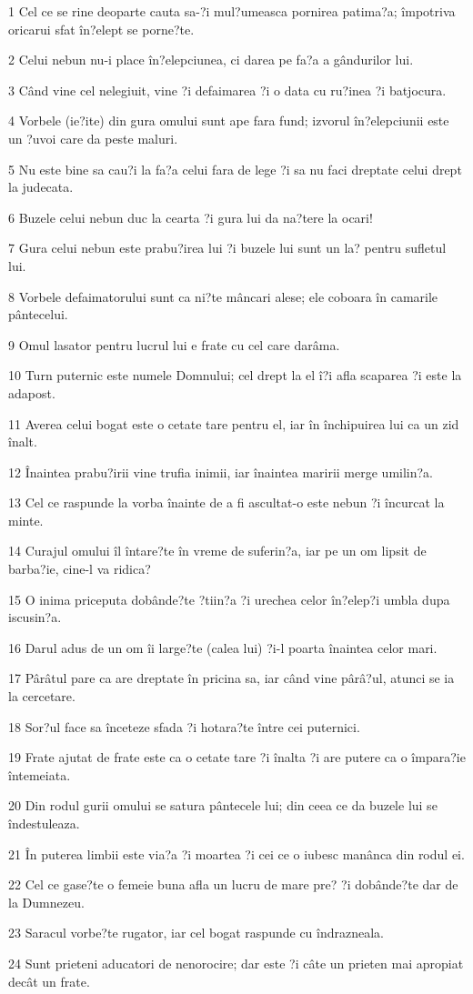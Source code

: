 \par 1 Cel ce se rine deoparte cauta sa-?i mul?umeasca pornirea patima?a; împotriva oricarui sfat în?elept se porne?te.
\par 2 Celui nebun nu-i place în?elepciunea, ci darea pe fa?a a gândurilor lui.
\par 3 Când vine cel nelegiuit, vine ?i defaimarea ?i o data cu ru?inea ?i batjocura.
\par 4 Vorbele (ie?ite) din gura omului sunt ape fara fund; izvorul în?elepciunii este un ?uvoi care da peste maluri.
\par 5 Nu este bine sa cau?i la fa?a celui fara de lege ?i sa nu faci dreptate celui drept la judecata.
\par 6 Buzele celui nebun duc la cearta ?i gura lui da na?tere la ocari!
\par 7 Gura celui nebun este prabu?irea lui ?i buzele lui sunt un la? pentru sufletul lui.
\par 8 Vorbele defaimatorului sunt ca ni?te mâncari alese; ele coboara în camarile pântecelui.
\par 9 Omul lasator pentru lucrul lui e frate cu cel care darâma.
\par 10 Turn puternic este numele Domnului; cel drept la el î?i afla scaparea ?i este la adapost.
\par 11 Averea celui bogat este o cetate tare pentru el, iar în închipuirea lui ca un zid înalt.
\par 12 Înaintea prabu?irii vine trufia inimii, iar înaintea maririi merge umilin?a.
\par 13 Cel ce raspunde la vorba înainte de a fi ascultat-o este nebun ?i încurcat la minte.
\par 14 Curajul omului îl întare?te în vreme de suferin?a, iar pe un om lipsit de barba?ie, cine-l va ridica?
\par 15 O inima priceputa dobânde?te ?tiin?a ?i urechea celor în?elep?i umbla dupa iscusin?a.
\par 16 Darul adus de un om îi large?te (calea lui) ?i-l poarta înaintea celor mari.
\par 17 Pârâtul pare ca are dreptate în pricina sa, iar când vine pârâ?ul, atunci se ia la cercetare.
\par 18 Sor?ul face sa înceteze sfada ?i hotara?te între cei puternici.
\par 19 Frate ajutat de frate este ca o cetate tare ?i înalta ?i are putere ca o împara?ie întemeiata.
\par 20 Din rodul gurii omului se satura pântecele lui; din ceea ce da buzele lui se îndestuleaza.
\par 21 În puterea limbii este via?a ?i moartea ?i cei ce o iubesc manânca din rodul ei.
\par 22 Cel ce gase?te o femeie buna afla un lucru de mare pre? ?i dobânde?te dar de la Dumnezeu.
\par 23 Saracul vorbe?te rugator, iar cel bogat raspunde cu îndrazneala.
\par 24 Sunt prieteni aducatori de nenorocire; dar este ?i câte un prieten mai apropiat decât un frate.


